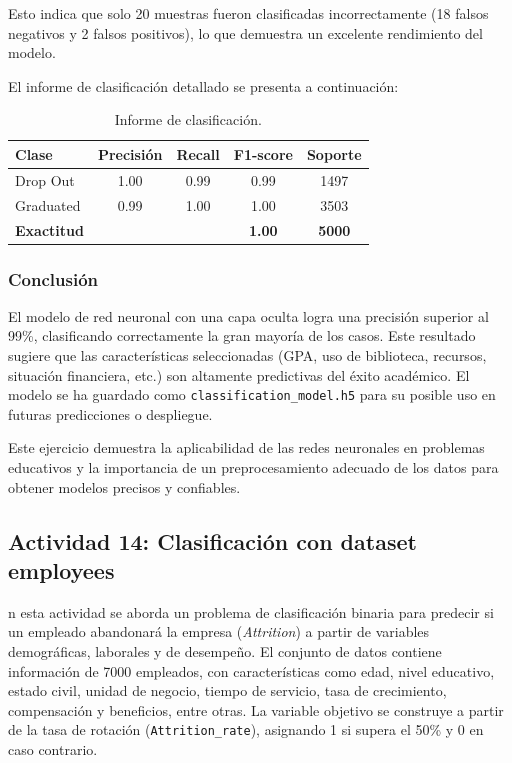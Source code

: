 \documentclass[12pt]{article}
\begin{document}
Esto indica que solo 20 muestras fueron clasificadas incorrectamente (18 falsos negativos y 2 falsos positivos), lo que demuestra un excelente rendimiento del modelo.

El informe de clasificación detallado se presenta a continuación:

\begin{table}[htbp]
\centering
\caption{Informe de clasificación.}
\label{tab:clasificacion_report}
\begin{tabular}{l c c c c}
\toprule
\textbf{Clase} & \textbf{Precisión} & \textbf{Recall} & \textbf{F1-score} & \textbf{Soporte} \\
\midrule
Drop Out & 1.00 & 0.99 & 0.99 & 1497 \\
Graduated & 0.99 & 1.00 & 1.00 & 3503 \\
\midrule
\textbf{Exactitud} & & & \textbf{1.00} & \textbf{5000} \\
\bottomrule
\end{tabular}
\end{table}

\subsubsection*{Conclusión}

El modelo de red neuronal con una capa oculta logra una precisión superior al 99\%, clasificando correctamente la gran mayoría de los casos. Este resultado sugiere que las características seleccionadas (GPA, uso de biblioteca, recursos, situación financiera, etc.) son altamente predictivas del éxito académico. El modelo se ha guardado como \texttt{classification\_model.h5} para su posible uso en futuras predicciones o despliegue.

Este ejercicio demuestra la aplicabilidad de las redes neuronales en problemas educativos y la importancia de un preprocesamiento adecuado de los datos para obtener modelos precisos y confiables.

\subsection{Actividad 14: Clasificación con dataset employees}

n esta actividad se aborda un problema de clasificación binaria para predecir si un empleado abandonará la empresa (\textit{Attrition}) a partir de variables demográficas, laborales y de desempeño. El conjunto de datos contiene información de 7000 empleados, con características como edad, nivel educativo, estado civil, unidad de negocio, tiempo de servicio, tasa de crecimiento, compensación y beneficios, entre otras. La variable objetivo se construye a partir de la tasa de rotación (\texttt{Attrition\_rate}), asignando 1 si supera el 50\% y 0 en caso contrario.
\end{document}

